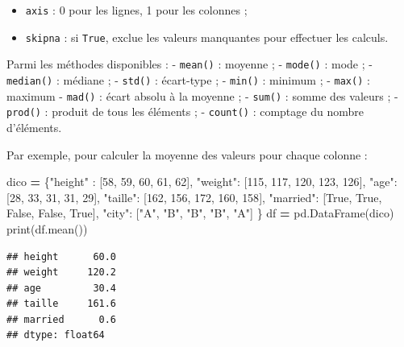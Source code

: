 \documentclass[12pt,]{book}
\newenvironment{Shaded}{\begin{snugshade}}{\end{snugshade}}
\newcommand{\DecValTok}[1]{\textcolor[rgb]{0.00,0.00,0.81}{#1}}
\newcommand{\StringTok}[1]{\textcolor[rgb]{0.31,0.60,0.02}{#1}}
\newcommand{\VariableTok}[1]{\textcolor[rgb]{0.00,0.00,0.00}{#1}}
\newcommand{\OperatorTok}[1]{\textcolor[rgb]{0.81,0.36,0.00}{\textbf{#1}}}
\newcommand{\BuiltInTok}[1]{#1}
\newcommand{\NormalTok}[1]{#1}
\providecommand{\tightlist}{%
  \setlength{\itemsep}{0pt}\setlength{\parskip}{0pt}}
\numberwithin{equation}{section}
\numberwithin{countremarque}{section}
\begin{document}
\begin{itemize}
\tightlist
\item
  \texttt{axis} : 0 pour les lignes, 1 pour les colonnes ;
\item
  \texttt{skipna} : si \texttt{True}, exclue les valeurs manquantes pour
  effectuer les calculs.
\end{itemize}

Parmi les méthodes disponibles : - \texttt{mean()} : moyenne ; -
\texttt{mode()} : mode ; - \texttt{median()} : médiane ; -
\texttt{std()} : écart-type ; - \texttt{min()} : minimum ; -
\texttt{max()} : maximum - \texttt{mad()} : écart absolu à la moyenne ;
- \texttt{sum()} : somme des valeurs ; - \texttt{prod()} : produit de
tous les éléments ; - \texttt{count()} : comptage du nombre d'éléments.

Par exemple, pour calculer la moyenne des valeurs pour chaque colonne :

\begin{Shaded}
\begin{Highlighting}[]
\NormalTok{dico }\OperatorTok{=}\NormalTok{ \{}\StringTok{"height"}\NormalTok{ : [}\DecValTok{58}\NormalTok{, }\DecValTok{59}\NormalTok{, }\DecValTok{60}\NormalTok{, }\DecValTok{61}\NormalTok{, }\DecValTok{62}\NormalTok{],}
        \StringTok{"weight"}\NormalTok{: [}\DecValTok{115}\NormalTok{, }\DecValTok{117}\NormalTok{, }\DecValTok{120}\NormalTok{, }\DecValTok{123}\NormalTok{, }\DecValTok{126}\NormalTok{],}
        \StringTok{"age"}\NormalTok{: [}\DecValTok{28}\NormalTok{, }\DecValTok{33}\NormalTok{, }\DecValTok{31}\NormalTok{, }\DecValTok{31}\NormalTok{, }\DecValTok{29}\NormalTok{],}
        \StringTok{"taille"}\NormalTok{: [}\DecValTok{162}\NormalTok{, }\DecValTok{156}\NormalTok{, }\DecValTok{172}\NormalTok{, }\DecValTok{160}\NormalTok{, }\DecValTok{158}\NormalTok{],}
        \StringTok{"married"}\NormalTok{: [}\VariableTok{True}\NormalTok{, }\VariableTok{True}\NormalTok{, }\VariableTok{False}\NormalTok{, }\VariableTok{False}\NormalTok{, }\VariableTok{True}\NormalTok{],}
        \StringTok{"city"}\NormalTok{: [}\StringTok{"A"}\NormalTok{, }\StringTok{"B"}\NormalTok{, }\StringTok{"B"}\NormalTok{, }\StringTok{"B"}\NormalTok{, }\StringTok{"A"}\NormalTok{]}
\NormalTok{       \} }
\NormalTok{df }\OperatorTok{=}\NormalTok{ pd.DataFrame(dico)}
\BuiltInTok{print}\NormalTok{(df.mean())}
\end{Highlighting}
\end{Shaded}

\begin{lstlisting}
## height      60.0
## weight     120.2
## age         30.4
## taille     161.6
## married      0.6
## dtype: float64
\end{lstlisting}
\end{document}
